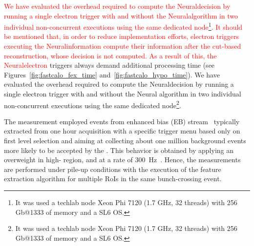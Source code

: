 \textcolor{red}{We have evaluated the overhead required to compute the Neural\rnn decision by running a single electron trigger with and without the Neural\rnn algorithm in two individual non-concurrent executions using the same dedicated node\footnote{It was used a techlab node Xeon Phi 7120 (1.7 GHz, 32 threads) with 256 Gb@1333 of memory and a SL6 OS.}. It should be mentioned that, in order to reduce implementation efforts, electron triggers executing the Neural\rnn information compute their information after the cut-based reconstruction, whose decision is not computed. As a result of this, the Neural\rnn electron }
triggers always demand additional \fastcalo processing time (see Figures~\ref{fig:fastcalo_fex_time}
and~\ref{fig:fastcalo_hypo_time}).  We have evaluated the overhead required to
compute the Neural\rnn decision by running a single electron trigger with and without
the Neural\rnn{} algorithm in two individual non-concurrent executions using the same
dedicated node\footnote{It was used a techlab node Xeon Phi 7120 (1.7 GHz, 32 threads) 
	with 256 Gb@1333 of memory and a SL6 OS.}.

The measurement employed events from enhanced bias (EB)
stream~\cite{eb_description} typically extracted from one hour acquisition with
a specific trigger menu based only on first level selection and aiming at
collecting about one million background events more likely to be accepted by the
\hlt{}. This behavior is obtained by applying an overweight in high-\pt{} region,
and at a rate of \SI{300}{\hertz}~\cite{eb_specifications}. Hence, the
measurements are performed under pile-up conditions with the execution of the
feature extraction algorithm for multiple RoIs in the same bunch-crossing event.


